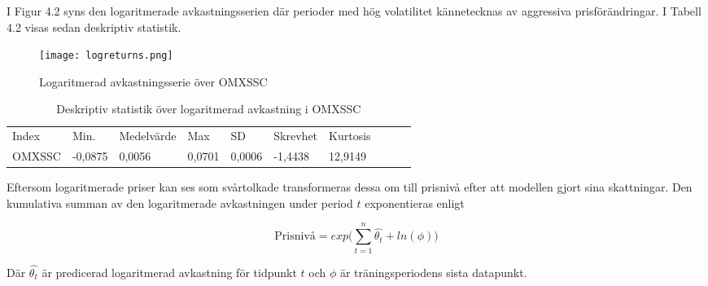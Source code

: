 \documentclass[11pt]{article}
\numberwithin{equation}{section}
\numberwithin{table}{section}
\numberwithin{figure}{section}
\begin{document}
\begin{table}[H]
\caption{Deskprivtiv statistik över priser i OMXSSC}
\end{table}

I Figur 4.2 syns den logaritmerade avkastningsserien där perioder med hög volatilitet kännetecknas av aggressiva prisförändringar. I Tabell 4.2 visas sedan deskriptiv statistik. 

\begin{figure}[H]
\caption{Logaritmerad avkastningsserie över OMXSSC}
\texttt{[image: logreturns.png]}
\centering
\end{figure}



\begin{table}[H]
\caption{Deskriptiv statistik över logaritmerad avkastning i OMXSSC}
\begin{tabular}{@{}llllllllll@{}}
\cmidrule(r){1-7}
%
Index  & Min.    & Medelvärde & Max    & SD     & Skrevhet & Kurtosis \\ \cmidrule(r){1-7}
OMXSSC & -0,0875 & 0,0056     & 0,0701 & 0,0006 & -1,4438  & 12,9149  \\ \cmidrule(r){1-7}
\end{tabular}
\end{table}






Eftersom logaritmerade priser kan ses som svårtolkade transformeras dessa om till prisnivå efter att modellen gjort sina skattningar. Den kumulativa summan av den logaritmerade avkastningen under period $t$ exponentieras enligt

\begin{equation}
    \text{Prisnivå} =  exp\Big({\sum\limits_{t=1}^n \hat{\theta_{t}}} + ln(\phi)\Big)
\end{equation}

Där  $\hat{\theta_t}$ är predicerad logaritmerad avkastning för tidpunkt $t$ och $\phi$ är träningsperiodens sista datapunkt. 


\end{document}
